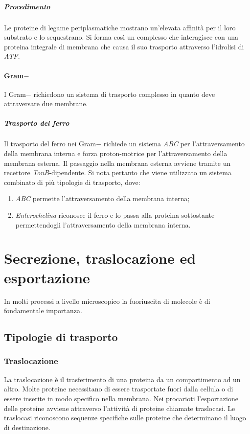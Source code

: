 				\subparagraph{Procedimento}
				Le proteine di legame periplasmatiche mostrano un'elevata affinit\`a per il loro substrato e lo sequestrano.
				Si forma cos\`i un complesso che interagisce con una proteina integrale di membrana che causa il suo trasporto attraverso l'idrolisi di \emph{ATP}.

			\paragraph{Gram$\mathbf{-}$}
			I Gram$-$ richiedono un sistema di trasporto complesso in quanto deve attraversare due membrane.

				\subparagraph{Trasporto del ferro}
				Il trasporto del ferro nei Gram$-$ richiede un sistema \emph{ABC} per l'attraversamento della membrana interna e forza proton-motrice per l'attraversamento della membrana esterna.
				Il passaggio nella membrana esterna avviene tramite un recettore \emph{TonB}-dipendente.
				Si nota pertanto che viene utilizzato un sistema combinato di pi\`u tipologie di trasporto, dove:
				\begin{enumerate}
					\item \emph{ABC} permette l'attraversamento della membrana interna; 
					\item \emph{Enterochelina} riconosce il ferro e lo passa alla proteina sottostante permettendogli l'attraversamento della membrana interna.
				\end{enumerate}
\section{Secrezione, traslocazione ed esportazione}
In molti processi a livello microscopico la fuoriuscita di molecole \`e di fondamentale importanza.

	\subsection{Tipologie di trasporto}

		\subsubsection{Traslocazione}
		La traslocazione \`e il trasferimento di una proteina da un compartimento ad un altro. 
		Molte proteine necessitano di essere trasportate fuori dalla cellula o di essere inserite in modo specifico nella membrana. 
		Nei procarioti l'esportazione delle proteine avviene attraverso l'attivit\`a di proteine chiamate traslocasi. 
		Le traslocasi riconoscono sequenze specifiche sulle proteine che determinano il luogo di destinazione.

